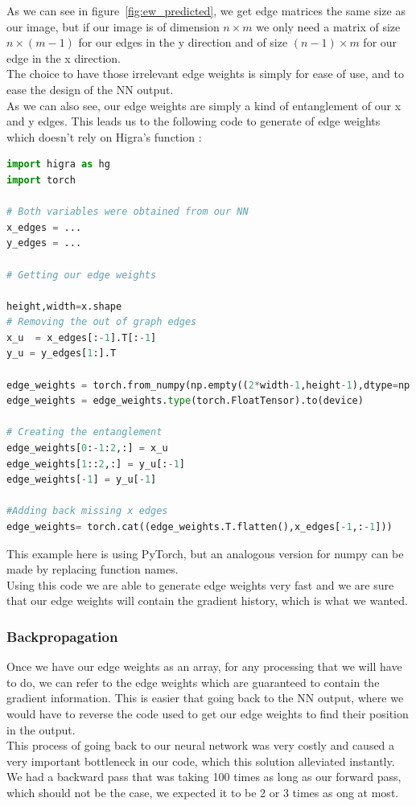 As we can see in figure~\ref{fig:ew_predicted}, we get edge matrices the same
size as our image, but if our image is of dimension $n\times m$ we only need a
matrix of size $n\times (m-1)$ for our edges in the y direction and of size
$(n-1)\times m$ for our edge in the x direction.\\
The choice to have those irrelevant edge weights is simply for ease of use, and
to ease the design of the NN output.\\

As we can also see, our edge weights are simply a
kind of entanglement of our x and y edges. This leads us to the following code
to generate of edge weights which doesn't rely on Higra's function :
\begin{lstlisting}[language=Python]
import higra as hg
import torch

# Both variables were obtained from our NN
x_edges = ...
y_edges = ...

# Getting our edge weights

height,width=x.shape
# Removing the out of graph edges
x_u  = x_edges[:-1].T[:-1]
y_u = y_edges[1:].T

edge_weights = torch.from_numpy(np.empty((2*width-1,height-1),dtype=np.float64))
edge_weights = edge_weights.type(torch.FloatTensor).to(device)

# Creating the entanglement
edge_weights[0:-1:2,:] = x_u
edge_weights[1::2,:] = y_u[:-1]
edge_weights[-1] = y_u[-1]

#Adding back missing x edges
edge_weights= torch.cat((edge_weights.T.flatten(),x_edges[-1,:-1]))
\end{lstlisting}

This example here is using PyTorch, but an analogous version for numpy can be
made by replacing function names.\\

Using this code we are able to generate edge weights very fast and we are sure
that our edge weights will contain the gradient history, which is what we
wanted.

\subsubsection{Backpropagation}

Once we have our edge weights as an array, for any processing that we will have
to do, we can refer to the edge weights which are guaranteed to contain the
gradient information. This is easier that going back to the NN output, where we
would have to reverse the code used to get our edge weights to find their
position in the output.\\

This process of going back to our neural network was very costly and caused a
very important bottleneck in our code, which this solution alleviated
instantly. We had a backward pass that was taking 100 times as long as our
forward pass, which should not be the case, we expected it to be 2 or 3 times
as ong at most.
